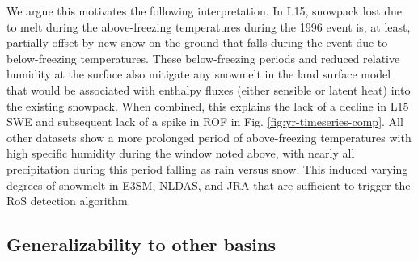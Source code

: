 \documentclass[nhess, manuscript]{copernicus}
\begin{document}
We argue this motivates the following interpretation.
In L15, snowpack lost due to melt during the above-freezing temperatures during the 1996 event is, at least, partially offset by new snow on the ground that falls during the event due to below-freezing temperatures.
These below-freezing periods and reduced relative humidity at the surface also mitigate any snowmelt in the land surface model that would be associated with enthalpy fluxes (either sensible or latent heat) into the existing snowpack.
When combined, this explains the lack of a decline in L15 SWE and subsequent lack of a spike in ROF in Fig. \ref{fig:yr-timeseries-comp}.
All other datasets show a more prolonged period of above-freezing temperatures with high specific humidity during the window noted above, with nearly all precipitation during this period falling as rain versus snow.
This induced varying degrees of snowmelt in E3SM, NLDAS, and JRA that are sufficient to trigger the RoS detection algorithm.

\subsection{Generalizability to other basins}
\label{subsec:other-basins}
\end{document}
